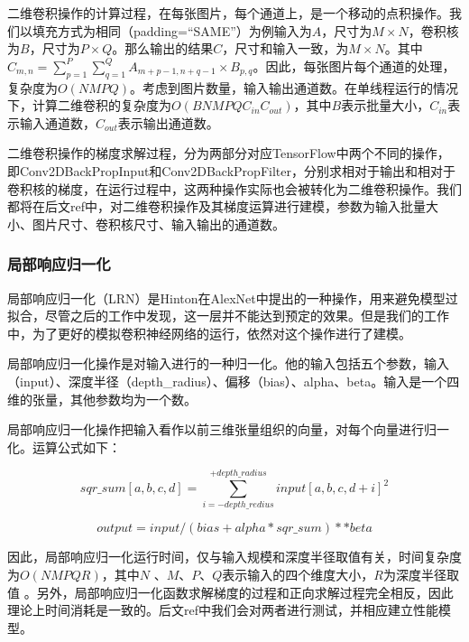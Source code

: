     二维卷积操作的计算过程，在每张图片，每个通道上，是一个移动的点积操作。我们以填充方式为相同（padding=“SAME”）为例输入为$ A $，尺寸为$ M \times N $，卷积核为$ B $，尺寸为$ P \times Q $。那么输出的结果$ C $，尺寸和输入一致，为$ M \times N $。其中 $ C_{m, n} = \sum_{p=1}^P\sum_{q=1}^Q{A_{m+p-1,n+q-1} \times B_{p,q}} $。因此，每张图片每个通道的处理，复杂度为$ O(N M P Q) $。考虑到图片数量，输入输出通道数。在单线程运行的情况下，计算二维卷积的复杂度为$ O(B N M P Q C_{in} C_{out}) $，其中$ B $表示批量大小，$ C_{in} $表示输入通道数，$ C_{out} $表示输出通道数。
    
    二维卷积操作的梯度求解过程，分为两部分对应TensorFlow中两个不同的操作，即Conv2DBackPropInput和Conv2DBackPropFilter，分别求相对于输出和相对于卷积核的梯度，在运行过程中，这两种操作实际也会被转化为二维卷积操作。我们都将在后文ref中，对二维卷积操作及其梯度运算进行建模，参数为输入批量大小、图片尺寸、卷积核尺寸、输入输出的通道数。
    
\subsubsection{局部响应归一化}
    局部响应归一化（LRN）是Hinton在AlexNet中提出的一种操作，用来避免模型过拟合，尽管之后的工作\cite{vggnet}中发现，这一层并不能达到预定的效果。但是我们的工作中，为了更好的模拟卷积神经网络的运行，依然对这个操作进行了建模。
    
    局部响应归一化操作是对输入进行的一种归一化。他的输入包括五个参数，输入（input）、深度半径（depth\_radius）、偏移（bias）、alpha、beta。输入是一个四维的张量，其他参数均为一个数。
    
    局部响应归一化操作把输入看作以前三维张量组织的向量，对每个向量进行归一化。运算公式如下：

    \begin{equation}
        sqr\_sum[a, b, c, d] = \sum_{i=-depth\_redius}^{+depth\_radius}input[a, b, c, d+i]^2
    \end{equation}

    \begin{equation}
        output = input / (bias + alpha * sqr\_sum) ** beta
    \end{equation}

    因此，局部响应归一化运行时间，仅与输入规模和深度半径取值有关，时间复杂度为$ O(N M P Q R) $，其中$ N $ 、$ M $、$ P $、$ Q $表示输入的四个维度大小，$ R $为深度半径取值 。另外，局部响应归一化函数求解梯度的过程和正向求解过程完全相反，因此理论上时间消耗是一致的。后文ref中我们会对两者进行测试，并相应建立性能模型。
    
    
    